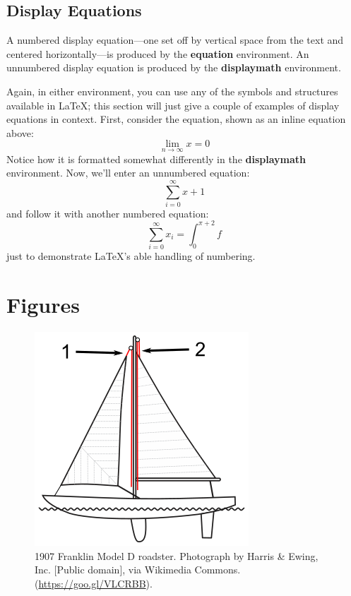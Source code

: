\documentclass[sigconf]{acmart}
\begin{document}
\subsection{Display Equations}
A numbered display equation---one set off by vertical space from the
text and centered horizontally---is produced by the \textbf{equation}
environment. An unnumbered display equation is produced by the
\textbf{displaymath} environment.

Again, in either environment, you can use any of the symbols and
structures available in \LaTeX\@; this section will just give a couple
of examples of display equations in context.  First, consider the
equation, shown as an inline equation above:
\begin{equation}
  \lim_{n\rightarrow \infty}x=0
\end{equation}
Notice how it is formatted somewhat differently in
the \textbf{displaymath}
environment.  Now, we'll enter an unnumbered equation:
\begin{displaymath}
  \sum_{i=0}^{\infty} x + 1
\end{displaymath}
and follow it with another numbered equation:
\begin{equation}
  \sum_{i=0}^{\infty}x_i=\int_{0}^{\pi+2} f
\end{equation}
just to demonstrate \LaTeX's able handling of numbering.

\section{Figures}

\begin{figure}[h]
  \centering
  \includegraphics[width=\linewidth]{img/Halyard}
  \caption{1907 Franklin Model D roadster. Photograph by Harris \&
    Ewing, Inc. [Public domain], via Wikimedia
    Commons. (\url{https://goo.gl/VLCRBB}).}
\end{figure}
\end{document}
